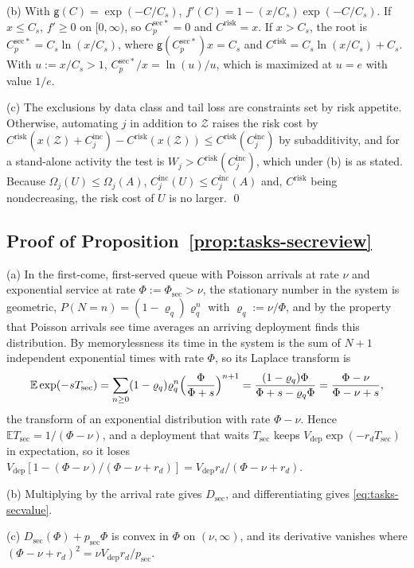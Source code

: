 (b) With $\mathsf g(C)=\exp(-C/C_s)$, $f'(C)=1-(x/C_s)\exp(-C/C_s)$. If $x\le C_s$, $f'\ge 0$ on $[0,\infty)$, so $C^{\mathrm{sec}*}_p=0$ and $C^{\mathrm{risk}}=x$. If $x>C_s$, the root is $C^{\mathrm{sec}*}_p=C_s\ln(x/C_s)$, where $\mathsf g(C^{\mathrm{sec}*}_p)x=C_s$ and $C^{\mathrm{risk}}=C_s\ln(x/C_s)+C_s$. With $u:=x/C_s>1$, $C^{\mathrm{sec}*}_p/x=\ln(u)/u$, which is maximized at $u=e$ with value $1/e$.

(c) The exclusions by data class and tail loss are constraints set by risk appetite. Otherwise, automating $j$ in addition to $\mathcal Z$ raises the risk cost by $C^{\mathrm{risk}}(x(\mathcal Z)+C^{\mathrm{inc}}_j)-C^{\mathrm{risk}}(x(\mathcal Z))\le C^{\mathrm{risk}}(C^{\mathrm{inc}}_j)$ by subadditivity, and for a stand-alone activity the test is $W_j>C^{\mathrm{risk}}(C^{\mathrm{inc}}_j)$, which under (b) is as stated. Because $\Omega_j(U)\le\Omega_j(A)$, $C^{\mathrm{inc}}_j(U)\le C^{\mathrm{inc}}_j(A)$ and, $C^{\mathrm{risk}}$ being nondecreasing, the risk cost of $U$ is no larger. \qed

\subsection*{Proof of Proposition~\ref{prop:tasks-secreview}}

(a) In the first-come, first-served queue with Poisson arrivals at rate $\nu$ and exponential service at rate $\Phi:=\Phi_{\mathrm{sec}}>\nu$, the stationary number in the system is geometric, $P(N=n)=(1-\varrho_q)\varrho_q^n$ with $\varrho_q:=\nu/\Phi$, and by the property that Poisson arrivals see time averages an arriving deployment finds this distribution. By memorylessness its time in the system is the sum of $N+1$ independent exponential times with rate $\Phi$, so its Laplace transform is
\[
\mathbb E\exp(-sT_{\mathrm{sec}})=\sum_{n\ge 0}(1-\varrho_q)\varrho_q^n\Bigl(\frac{\Phi}{\Phi+s}\Bigr)^{n+1}=\frac{(1-\varrho_q)\Phi}{\Phi+s-\varrho_q\Phi}=\frac{\Phi-\nu}{\Phi-\nu+s},
\]
the transform of an exponential distribution with rate $\Phi-\nu$. Hence $\mathbb ET_{\mathrm{sec}}=1/(\Phi-\nu)$, and a deployment that waits $T_{\mathrm{sec}}$ keeps $V_{\mathrm{dep}}\exp(-r_dT_{\mathrm{sec}})$ in expectation, so it loses $V_{\mathrm{dep}}[1-(\Phi-\nu)/(\Phi-\nu+r_d)]=V_{\mathrm{dep}}r_d/(\Phi-\nu+r_d)$.

(b) Multiplying by the arrival rate gives $D_{\mathrm{sec}}$, and differentiating gives \eqref{eq:tasks-secvalue}.

(c) $D_{\mathrm{sec}}(\Phi)+p_{\mathrm{sec}}\Phi$ is convex in $\Phi$ on $(\nu,\infty)$, and its derivative vanishes where $(\Phi-\nu+r_d)^2=\nu V_{\mathrm{dep}}r_d/p_{\mathrm{sec}}$.

